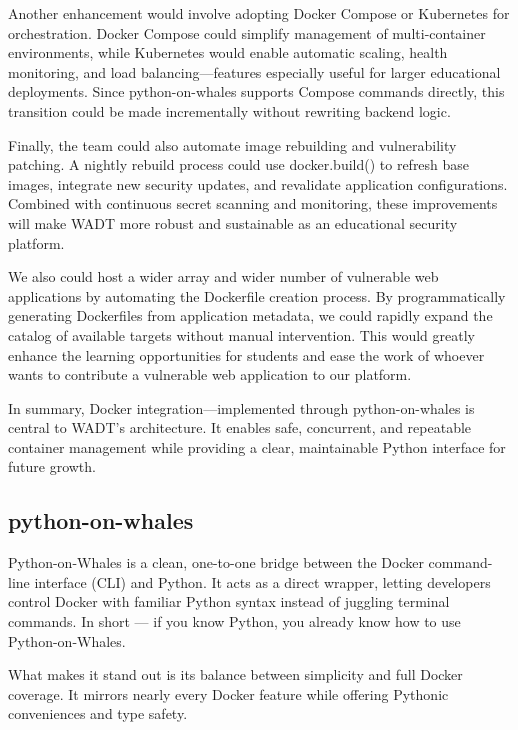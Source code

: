 \documentclass[12pt]{article}
\begin{document}
Another enhancement would involve adopting Docker Compose or Kubernetes for orchestration. Docker Compose could simplify management of multi-container environments, while Kubernetes would enable automatic scaling, health monitoring, and load balancing—features especially useful for larger educational deployments. Since python-on-whales supports Compose commands directly, this transition could be made incrementally without rewriting backend logic.

Finally, the team could also automate image rebuilding and vulnerability patching. A nightly rebuild process could use docker.build() to refresh base images, integrate new security updates, and revalidate application configurations. Combined with continuous secret scanning and monitoring, these improvements will make WADT more robust and sustainable as an educational security platform.

We also could host a wider array and wider number of vulnerable web applications by automating the Dockerfile creation process. By programmatically generating Dockerfiles from application metadata, we could rapidly expand the catalog of available targets without manual intervention. This would greatly enhance the learning opportunities for students and ease the work of whoever wants to contribute a vulnerable web application to our platform.

In summary, Docker integration—implemented through python-on-whales is central to WADT’s architecture. It enables safe, concurrent, and repeatable container management while providing a clear, maintainable Python interface for future growth.


\subsection{python-on-whales}
Python-on-Whales is a clean, one-to-one bridge between the Docker command-line interface (CLI) and Python. 
It acts as a direct wrapper, letting developers control Docker with familiar Python syntax instead of juggling terminal commands. 
In short — if you know Python, you already know how to use Python-on-Whales.

What makes it stand out is its balance between simplicity and full Docker coverage. 
It mirrors nearly every Docker feature while offering Pythonic conveniences and type safety.
\end{document}
